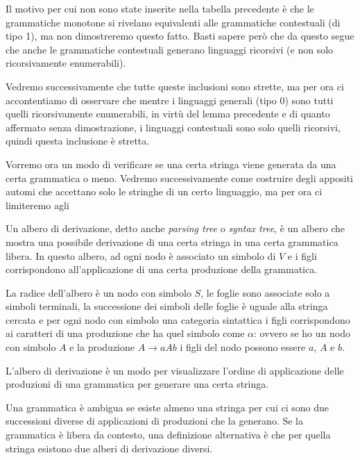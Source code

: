 \documentclass[12pt]{article}
\numberwithin{theorem}{subsection}
\begin{document}
Il motivo per cui non sono state inserite nella tabella precedente è che le grammatiche monotone si rivelano equivalenti alle grammatiche contestuali (di tipo 1), ma non dimostreremo questo fatto. Basti sapere però che da questo segue che anche le grammatiche contestuali generano linguaggi ricorsivi (e non solo ricorsivamente enumerabili).

Vedremo successivamente che tutte queste inclusioni sono strette, ma per ora ci accontentiamo di osservare che mentre i linguaggi generali (tipo 0) sono tutti quelli ricorsivamente enumerabili, in virtù del lemma precedente e di quanto affermato senza dimostrazione, i linguaggi contestuali sono solo quelli ricorsivi, quindi questa inclusione è stretta.

Vorremo ora un modo di verificare se una certa stringa viene generata da una certa grammatica o meno. Vedremo successivamente come costruire degli appositi automi che accettano solo le stringhe di un certo linguaggio, ma per ora ci limiteremo agli

\begin{definition}
	Un albero di derivazione, detto anche \textit{parsing tree} o \textit{syntax tree}, è un albero che mostra una possibile derivazione di una certa stringa in una certa grammatica libera. In questo albero, ad ogni nodo è associato un simbolo di $V$ e i figli corrispondono all'applicazione di una certa produzione della grammatica.
	
	La radice dell'albero è un nodo con simbolo $S$, le foglie sono associate solo a simboli terminali, la successione dei simboli delle foglie è uguale alla stringa cercata e per ogni nodo con simbolo una categoria sintattica i figli corrispondono ai caratteri di una produzione che ha quel simbolo come $\alpha$: ovvero se ho un nodo con simbolo $A$ e la produzione $A \rightarrow aAb$ i figli del nodo possono essere $a$, $A$ e $b$.
\end{definition}
L'albero di derivazione è un modo per visualizzare l'ordine di applicazione delle produzioni di una grammatica per generare una certa stringa.

\begin{definition}
	Una grammatica è ambigua se esiste almeno una stringa per cui ci sono due successioni diverse di applicazioni di produzioni che la generano. Se la grammatica è libera da contesto, una definizione alternativa è che per quella stringa esistono due alberi di derivazione diversi.
\end{definition}
\end{document}
